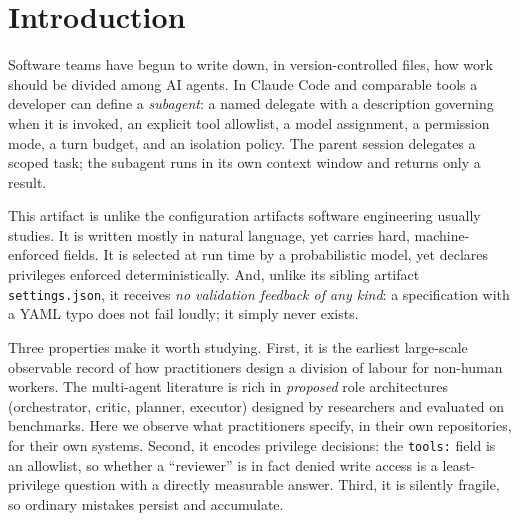 \documentclass[smallextended,natbib]{svjour3}
\newcommand{\code}[1]{\texttt{\small #1}}
\begin{document}
\section{Introduction}
\label{sec:intro}

Software teams have begun to write down, in version-controlled files, how work should be divided among
AI agents. In Claude Code and comparable tools a developer can define a \emph{subagent}: a named
delegate with a description governing when it is invoked, an explicit tool allowlist, a model
assignment, a permission mode, a turn budget, and an isolation policy. The parent session delegates a
scoped task; the subagent runs in its own context window and returns only a result.

This artifact is unlike the configuration artifacts software engineering usually studies. It is
written mostly in natural language, yet carries hard, machine-enforced fields. It is selected at run
time by a probabilistic model, yet declares privileges enforced deterministically. And, unlike its
sibling artifact \code{settings.json}, it receives \emph{no validation feedback of any kind}: a
specification with a YAML typo does not fail loudly; it simply never exists.

Three properties make it worth studying. First, it is the earliest large-scale observable record of
how practitioners design a division of labour for non-human workers. The multi-agent literature is
rich in \emph{proposed} role architectures (orchestrator, critic, planner, executor) designed by
researchers and evaluated on benchmarks. Here we observe what practitioners specify, in their own
repositories, for their own systems. Second, it encodes privilege decisions: the \code{tools:} field
is an allowlist, so whether a ``reviewer'' is in fact denied write access is a least-privilege
question with a directly measurable answer. Third, it is silently fragile, so ordinary mistakes
persist and accumulate.
\end{document}
